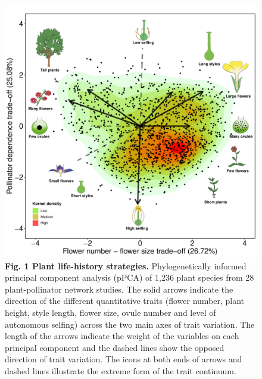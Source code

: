 \documentclass[12pt,a4paper,]{article}
\begin{document}
\begin{figure}
\centering
\includegraphics{output/figures/unnamed-chunk-1-1.pdf}
\caption{\label{fig:unnamed-chunk-1}\textbf{Fig. 1 \textbar{} Plant
life-history strategies.} Phylogenetically informed principal component
analysis (pPCA) of 1,236 plant species from 28 plant-pollinator network
studies. The solid arrows indicate the direction of the different
quantitative traits (flower number, plant height, style length, flower
size, ovule number and level of autonomous selfing) across the two main
axes of trait variation. The length of the arrows indicate the weight of
the variables on each principal component and the dashed lines show the
opposed direction of trait variation. The icons at both ends of arrows
and dashed lines illustrate the extreme form of the trait continuum.}
\end{figure}
\end{document}
